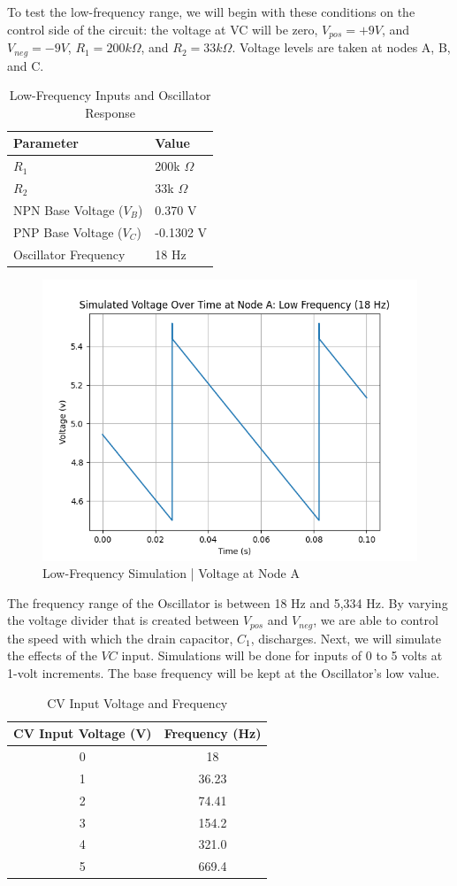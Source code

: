 \documentclass{article}
\begin{document}
To test the low-frequency range, we will begin with these conditions on the control side of the circuit: the voltage at VC will be zero, $V_{pos} = +9 V$, and $V_{neg} = -9 V$, $R_1 = 200k \Omega$, and $R_2 = 33k \Omega$. Voltage levels are taken at nodes A, B, and C.

\begin{table}[H]
  \centering
  \begin{tabular}{ll}
    \toprule
    Parameter & Value \\
    \midrule
    $R_1$ & 200k $\Omega$ \\
    $R_2$ & 33k $\Omega$ \\
    NPN Base Voltage ($V_B$) & 0.370 V \\
    PNP Base Voltage ($V_C$) & -0.1302 V \\
    Oscillator Frequency & 18 Hz \\
    \bottomrule
  \end{tabular}
  \caption{Low-Frequency Inputs and Oscillator Response}
\end{table}
\vspace{-1.5cm}
\begin{figure}[H]
  \centering
  \includegraphics[width=.7\linewidth]{png/Figure_2.png}
  \caption{Low-Frequency Simulation | Voltage at Node A}
\end{figure}


The frequency range of the Oscillator is between 18 Hz and 5,334 Hz. By varying the voltage divider that is created between $V_{pos}$ and $V_{neg}$, we are able to control the speed with which the drain capacitor, $C_1$, discharges. Next, we will simulate the effects of the $VC$ input. Simulations will be done for inputs of 0 to 5 volts at 1-volt increments. The base frequency will be kept at the Oscillator's low value.

\begin{table}[H]
  \centering
  \begin{tabular}{cc}
    \toprule
    \textbf{CV Input Voltage (V)} & \textbf{Frequency (Hz)} \\
    \midrule
    0 & 18 \\
    1 & 36.23 \\
    2 & 74.41 \\
    3 & 154.2 \\
    4 & 321.0 \\
    5 & 669.4 \\
    \bottomrule
  \end{tabular}
  \caption{CV Input Voltage and Frequency}
\end{table}
\end{document}
